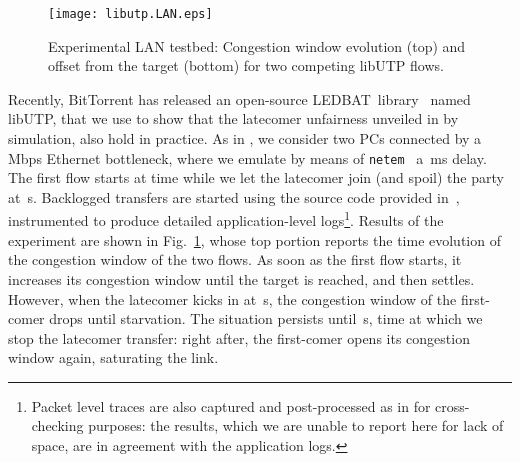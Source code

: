 \documentclass[conference]{IEEEtran}
\newcommand{\figR}[1]{Fig.~\ref{fig:#1}}
\newcommand{\figLC}[2]{
        \caption{#2}
        \label{fig:#1}
        \vspace{-5pt}
}
\newcommand{\btledbat}[0]{LEDBAT}
\begin{document}
\begin{figure}[t]
\centering
        \texttt{[image: libutp.LAN.eps]}
	\figLC{motivation}{Experimental LAN testbed: Congestion window evolution (top) and offset from the target (bottom) for two competing libUTP flows.}
\end{figure}




Recently, BitTorrent has released an open-source \btledbat\ library~\cite{libutp_code} named libUTP, that we use to show that the latecomer unfairness unveiled in \cite{icccn10} by simulation, also hold in practice. As in \cite{icccn10}, we consider two PCs connected by a \,Mbps Ethernet bottleneck, where we emulate by means of \texttt{netem}~\cite{netem} a \,ms delay.
The first flow starts at time  while we let the latecomer join (and spoil) the party at \,s. Backlogged transfers are started using the source code provided in~\cite{libutp_code}, instrumented to produce detailed application-level logs\footnote{Packet level traces are also captured and post-processed as in \cite{pam10} for cross-checking purposes: the results, which we are unable to report here for lack of space, are in agreement with the application logs.}.
Results of the experiment are shown in \figR{motivation}, whose top portion reports the time evolution of the congestion window of the two flows. As soon as the first flow starts, it increases its congestion window until the target is reached, and then settles. However, when the latecomer kicks in at \,s, the congestion window of the first-comer drops until starvation. The situation persists until \,s, time at which we stop the latecomer transfer: right after, the first-comer opens its congestion window again, saturating the link.
\end{document}
